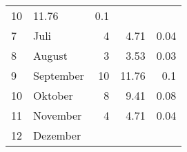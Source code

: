 \begin{longtable}{lXrrr}
       \num{10} &
       \num[round-mode=places,round-precision=2]{11,76} &
         \num[round-mode=places,round-precision=2]{0,1} \\

     7 &
     \multicolumn{1}{X}{ Juli   } &


       \num{4} &
       \num[round-mode=places,round-precision=2]{4,71} &
         \num[round-mode=places,round-precision=2]{0,04} \\

     8 &
     \multicolumn{1}{X}{ August   } &


       \num{3} &
       \num[round-mode=places,round-precision=2]{3,53} &
         \num[round-mode=places,round-precision=2]{0,03} \\

     9 &
     \multicolumn{1}{X}{ September   } &


       \num{10} &
       \num[round-mode=places,round-precision=2]{11,76} &
         \num[round-mode=places,round-precision=2]{0,1} \\

     10 &
     \multicolumn{1}{X}{ Oktober   } &


       \num{8} &
       \num[round-mode=places,round-precision=2]{9,41} &
         \num[round-mode=places,round-precision=2]{0,08} \\

     11 &
     \multicolumn{1}{X}{ November   } &


       \num{4} &
       \num[round-mode=places,round-precision=2]{4,71} &
         \num[round-mode=places,round-precision=2]{0,04} \\

     12 &
     \multicolumn{1}{X}{ Dezember   } &



\end{longtable}
